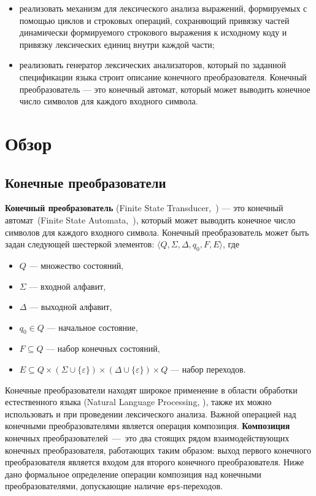 \documentclass{matmex-diploma}
\begin{document}
\begin{itemize}
\item реализовать механизм для лексического анализа выражений, формируемых с помощью циклов и строковых операций, сохраняющий привязку частей динамически формируемого строкового выражения к исходному коду и привязку лексических единиц внутри каждой части;
\item реализовать генератор лексических анализаторов, который по заданной спецификации языка строит описание конечного преобразователя. Конечный преобразователь --- это конечный автомат, который может выводить конечное число символов для каждого входного символа.
\end{itemize}


\section{Обзор}

\subsection{Конечные преобразователи}

\textbf{Конечный преобразователь} (Finite State Transducer,~\cite{FST}) {---} это конечный автомат~(Finite State Automata,~\cite{FSA}), который может выводить конечное число символов для каждого входного символа. Конечный преобразователь может быть задан следующей шестеркой элементов: $\langle Q, \Sigma, \Delta, q_0, F, E \rangle$, где

\begin{itemize}
\item $Q$ --- множество состояний, 
\item $\Sigma$ --- входной алфавит, 
\item $\Delta$ --- выходной алфавит, 
\item $q_0 \in Q$ --- начальное состояние, 
\item $F \subseteq Q$ --- набор конечных состояний, 
\item $E \subseteq Q \times (\Sigma \cup \{\varepsilon\}) \times (\Delta \cup \{\varepsilon\})  \times Q$ --- набор переходов. 
\end{itemize}

Конечные преобразователи находят широкое применение в области обработки естественного языка (Natural Language Processing, \cite{Mohri}), также их можно использовать и при проведении лексического анализа. Важной операцией над конечными преобразователями является операция композиция. \textbf{Композиция} конечных преобразователей~{---}~это два стоящих рядом  взаимодействующих конечных преобразователя, работающих таким образом: выход первого конечного преобразователя является входом для второго конечного преобразователя. Ниже дано формальное определение операции композиция над конечными преобразователями, допускающие наличие \verb|eps|-переходов.
\end{document}
